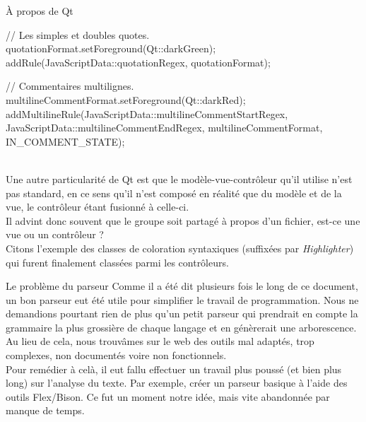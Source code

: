 \documentclass[a4paper, 12pt]{report}
\begin{document}
\begin{chapter}
\begin{section}{À propos de Qt}
\begin{center}
\begin{cppcode}
{    // Les simples et doubles quotes.
    quotationFormat.setForeground(Qt::darkGreen);
    addRule(JavaScriptData::quotationRegex, quotationFormat);

    // Commentaires multilignes.
    multilineCommentFormat.setForeground(Qt::darkRed);
    addMultilineRule(JavaScriptData::multilineCommentStartRegex,
                     JavaScriptData::multilineCommentEndRegex,
                     multilineCommentFormat,
                     IN_COMMENT_STATE);
}
			\end{cppcode}
			\end{center}~\\


			Une autre particularité de \gls{Qt} est que le modèle-vue-contrôleur qu'il utilise n'est pas standard, en ce sens qu'il n'est composé
			en réalité que du modèle et de la vue, le contrôleur étant fusionné à celle-ci.\\
			Il advint donc souvent que le groupe soit partagé à propos d'un fichier, est-ce une vue ou un contrôleur ? \\
			Citons l'exemple des classes de coloration syntaxiques (suffixées par \emph{Highlighter}) qui furent finalement classées parmi les
			contrôleurs.
	\end{section}

	\begin{section}{Le problème du parseur}
		Comme il a été dit plusieurs fois le long de ce document, un bon \gls{parseur} eut été utile pour simplifier le travail de programmation.
		Nous ne demandions pourtant rien de plus qu'un petit \gls{parseur} qui prendrait en compte la grammaire la plus grossière de chaque langage
		et en génèrerait une arborescence. Au lieu de cela, nous trouvâmes sur le web des outils mal adaptés, trop complexes, non documentés voire
		non fonctionnels.\\

		Pour remédier à celà, il eut fallu effectuer un travail plus poussé (et bien plus long) sur l'analyse du texte. Par exemple, créer un 
		\gls{parseur} basique à l'aide des outils \gls{Flex}/\gls{Bison}. Ce fut un moment notre idée, mais vite abandonnée par manque de temps.
	\end{section}


\end{chapter}
\end{document}
